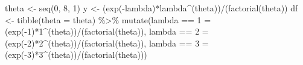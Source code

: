 \documentclass[
  letterpaper,
]{book}
\newenvironment{Shaded}{\begin{snugshade}}{\end{snugshade}}
\newcommand{\AttributeTok}[1]{\textcolor[rgb]{0.40,0.45,0.13}{#1}}
\newcommand{\DecValTok}[1]{\textcolor[rgb]{0.68,0.00,0.00}{#1}}
\newcommand{\FunctionTok}[1]{\textcolor[rgb]{0.28,0.35,0.67}{#1}}
\newcommand{\NormalTok}[1]{\textcolor[rgb]{0.00,0.23,0.31}{#1}}
\newcommand{\OtherTok}[1]{\textcolor[rgb]{0.00,0.23,0.31}{#1}}
\newcommand{\SpecialCharTok}[1]{\textcolor[rgb]{0.37,0.37,0.37}{#1}}
\newcommand{\StringTok}[1]{\textcolor[rgb]{0.13,0.47,0.30}{#1}}
\begin{document}
\begin{Shaded}
\begin{Highlighting}[]
\NormalTok{theta }\OtherTok{\textless{}{-}} \FunctionTok{seq}\NormalTok{(}\DecValTok{0}\NormalTok{, }\DecValTok{8}\NormalTok{, }\DecValTok{1}\NormalTok{)}
\NormalTok{y     }\OtherTok{\textless{}{-}}\NormalTok{ (}\FunctionTok{exp}\NormalTok{(}\SpecialCharTok{{-}}\NormalTok{lambda)}\SpecialCharTok{*}\NormalTok{lambda}\SpecialCharTok{\^{}}\NormalTok{(theta))}\SpecialCharTok{/}\NormalTok{(}\FunctionTok{factorial}\NormalTok{(theta))}
\NormalTok{df    }\OtherTok{\textless{}{-}} \FunctionTok{tibble}\NormalTok{(}\AttributeTok{theta =}\NormalTok{ theta) }\SpecialCharTok{\%\textgreater{}\%}
  \FunctionTok{mutate}\NormalTok{(}\StringTok{\textasciigrave{}}\AttributeTok{lambda == 1}\StringTok{\textasciigrave{}} \OtherTok{=}\NormalTok{ (}\FunctionTok{exp}\NormalTok{(}\SpecialCharTok{{-}}\DecValTok{1}\NormalTok{)}\SpecialCharTok{*}\DecValTok{1}\SpecialCharTok{\^{}}\NormalTok{(theta))}\SpecialCharTok{/}\NormalTok{(}\FunctionTok{factorial}\NormalTok{(theta)),}
         \StringTok{\textasciigrave{}}\AttributeTok{lambda == 2}\StringTok{\textasciigrave{}} \OtherTok{=}\NormalTok{ (}\FunctionTok{exp}\NormalTok{(}\SpecialCharTok{{-}}\DecValTok{2}\NormalTok{)}\SpecialCharTok{*}\DecValTok{2}\SpecialCharTok{\^{}}\NormalTok{(theta))}\SpecialCharTok{/}\NormalTok{(}\FunctionTok{factorial}\NormalTok{(theta)),}
         \StringTok{\textasciigrave{}}\AttributeTok{lambda == 3}\StringTok{\textasciigrave{}} \OtherTok{=}\NormalTok{ (}\FunctionTok{exp}\NormalTok{(}\SpecialCharTok{{-}}\DecValTok{3}\NormalTok{)}\SpecialCharTok{*}\DecValTok{3}\SpecialCharTok{\^{}}\NormalTok{(theta))}\SpecialCharTok{/}\NormalTok{(}\FunctionTok{factorial}\NormalTok{(theta)))}


\end{Highlighting}
\end{Shaded}
\end{document}
